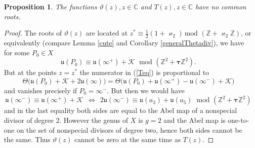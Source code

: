\documentclass[10pt,oneside,reqno]{amsart}
\numberwithin{equation}{section}
\newtheorem{lemma}[theorem]{Lemma}
\newtheorem{proposition}[theorem]{Proposition}
\def\bl{\begin{lemma}}
\def\mod{\, \mathrm{mod}\,\,}
\def\eqref#1{(\ref{#1})}
\begin{document}
\begin{proposition}
\label{nocommon} The functions $\vartheta(z),z\in\mathbb{C}$ and $T(z),z\in\mathbb{C}$ have no common roots.
\end{proposition}
\begin{proof} The roots of $\vartheta(z)$ are located at $z^{\ast}\equiv\frac{1}{2}(1+\varkappa_2)\mod(\mathbb{Z}+\varkappa_2\mathbb{Z})$, or equivalently 
(compare Lemma \ref{cute} and Corollary \ref{generalThetadiv}), we have for some $P_0\in X$
\begin{equation*}
  \mathfrak{u}(P_0)\equiv\mathfrak{u}(\infty^+)+\mathcal{K}\ \ \mod(\mathbb{Z}^2+{\boldsymbol \tau}\mathbb{Z}^2).
\end{equation*}
But at the points $z=z^{\ast}$ the numerator in \eqref{Teq} is proportional to
\begin{equation*}
  \Theta\big(\mathfrak{u}(P_0)+\mathcal{K}+2\mathfrak{u}(\infty)\big) = \Theta\big(\mathfrak{u}(P_0)+\mathfrak{u}(\infty^+)-\mathfrak{u}(\infty^-)+\mathcal{K}\big)
\end{equation*}
and vanishes precisely if $P_0=\infty^-$. But then we would have
\begin{equation*}
  \mathfrak{u}(\infty^-)\equiv \mathfrak{u}(\infty^+)+\mathcal{K}\ \ \Leftrightarrow\ \ 2\mathfrak{u}(\infty^-) \equiv \mathfrak{u}(a_3)+\mathfrak{u}(a_5)\ \ 
\mod(\mathbb{Z}^2+{\boldsymbol \tau}\mathbb{Z}^2)
\end{equation*}
and in the last equality both sides are equal to the Abel map of a nonspecial divisor of degree $2$. However the genus of $X$ is $g=2$ and the Abel map is one-to-one on the
set of nonspecial divisors of degree two, hence both sides cannot be the same. Thus $\vartheta(z)$ cannot be zero at the same time as $T(z)$.
\end{proof}
\end{document}
